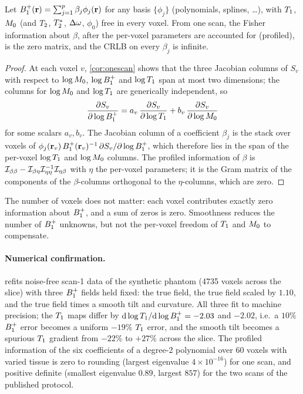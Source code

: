 \begin{corollary}\label{cor:parametric}
Let $B_1^{+}(\mathbf r)=\sum_{j=1}^p\beta_j\phi_j(\mathbf r)$ for any basis $\{\phi_j\}$ (polynomials, splines,
\dots), with $T_1$, $M_0$ (and $T_2$, $T_2^{*}$, $\Delta\omega$, $\phi_0$) free in every voxel. From one scan, the
Fisher information about $\beta$, after the per-voxel parameters are accounted for (profiled),
is the zero matrix, and the CRLB on every $\beta_j$ is infinite.
\end{corollary}
\begin{proof}
At each voxel $v$, \cref{cor:onescan} shows that the three Jacobian columns of $S_v$ with
respect to $\log M_0$, $\log B_1^{+}$ and $\log T_1$ span at most two dimensions; the columns for $\log M_0$
and $\log T_1$ are generically independent, so
\[
  \frac{\partial S_v}{\partial\log B_1^{+}}=a_v\,\frac{\partial S_v}{\partial\log T_1}+b_v\,\frac{\partial S_v}{\partial\log M_0}
\]
for some scalars $a_v,b_v$. The Jacobian column of a coefficient $\beta_j$ is the stack over voxels of
$\phi_j(\mathbf r_v)\,B_1^{+}(\mathbf r_v)^{-1}\,\partial S_v/\partial\log B_1^{+}$, which therefore lies in the span of the per-voxel
$\log T_1$ and $\log M_0$ columns. The profiled information of $\beta$ is
$\mathcal{I}_{\beta\beta}-\mathcal{I}_{\beta\eta}\mathcal{I}_{\eta\eta}^{-1}\mathcal{I}_{\eta\beta}$ with $\eta$ the per-voxel parameters; it is the Gram matrix
of the components of the $\beta$-columns orthogonal to the $\eta$-columns, which are zero.
\end{proof}

The number of voxels does not matter: each voxel contributes exactly zero information about
$B_1^{+}$, and a sum of zeros is zero. Smoothness reduces the number of $B_1^{+}$ unknowns, but not the
per-voxel freedom of $T_1$ and $M_0$ to compensate.

\paragraph{Numerical confirmation.}  refits noise-free scan-1 data of the
synthetic phantom (4735 voxels across the slice) with three $B_1^{+}$ fields held fixed: the true
field, the true field scaled by $1.10$, and the true field times a smooth tilt and curvature.
All three fit to machine precision; the $T_1$ maps differ by $\mathrm d\log T_1/\mathrm d\log B_1^{+}=-2.03$ and
$-2.02$, i.e.\ a $10\%$ $B_1^{+}$ error becomes a uniform $-19\%$ $T_1$ error, and the smooth tilt becomes a
spurious $T_1$ gradient from $-22\%$ to $+27\%$ across the slice. The profiled information of the six
coefficients of a degree-2 polynomial over 60 voxels with varied tissue is zero to rounding
(largest eigenvalue $4\times10^{-16}$) for one scan, and positive definite (smallest eigenvalue
$0.89$, largest $857$) for the two scans of the published protocol.

